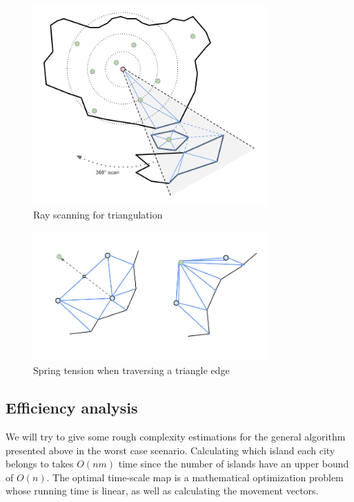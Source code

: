 \documentclass[a4paper,11pt]{article}
\begin{document}
\begin{figure}[h!]
  \centering
  \includegraphics[width=0.8\textwidth]{scan.png}
  \caption{Ray scanning for triangulation}
  \label{scan}
\end{figure}

\begin{figure}[h!]
  \centering
  \includegraphics[width=0.8\textwidth]{springs.png}
  \caption{Spring tension when traversing a triangle edge}
  \label{springs}
\end{figure}


\subsection{Efficiency analysis}
We will try to give some rough complexity estimations for the
general algorithm presented above in the worst case
scenario. Calculating which island each city belongs to takes $O(nm)$
time since the number of islands have an upper bound of $O(n)$. The
optimal time-scale map is a mathematical optimization problem whose
running time is linear, as well as calculating the movement
vectors.
\end{document}
